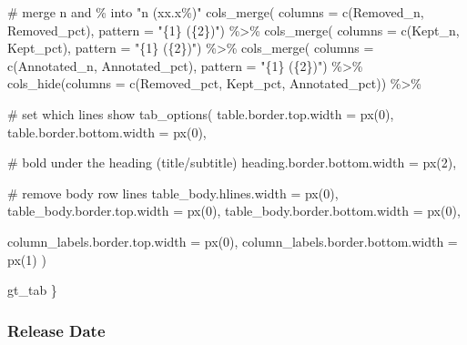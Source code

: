 \documentclass[
  man]{apa7}
\newenvironment{Shaded}{\begin{snugshade}}{\end{snugshade}}
\newcommand{\AttributeTok}[1]{\textcolor[rgb]{0.40,0.45,0.13}{#1}}
\newcommand{\CommentTok}[1]{\textcolor[rgb]{0.37,0.37,0.37}{#1}}
\newcommand{\DecValTok}[1]{\textcolor[rgb]{0.68,0.00,0.00}{#1}}
\newcommand{\FunctionTok}[1]{\textcolor[rgb]{0.28,0.35,0.67}{#1}}
\newcommand{\NormalTok}[1]{\textcolor[rgb]{0.00,0.23,0.31}{#1}}
\newcommand{\SpecialCharTok}[1]{\textcolor[rgb]{0.37,0.37,0.37}{#1}}
\newcommand{\StringTok}[1]{\textcolor[rgb]{0.13,0.47,0.30}{#1}}
\begin{document}
\begin{Shaded}
\begin{Highlighting}[]
    \CommentTok{\# merge n and \% into "n (xx.x\%)"}
    \FunctionTok{cols\_merge}\NormalTok{(}
      \AttributeTok{columns =} \FunctionTok{c}\NormalTok{(Removed\_n, Removed\_pct),}
      \AttributeTok{pattern =} \StringTok{"\{1\} (\{2\})"}\NormalTok{) }\SpecialCharTok{\%\textgreater{}\%}
    \FunctionTok{cols\_merge}\NormalTok{(}
      \AttributeTok{columns =} \FunctionTok{c}\NormalTok{(Kept\_n, Kept\_pct),}
      \AttributeTok{pattern =} \StringTok{"\{1\} (\{2\})"}\NormalTok{) }\SpecialCharTok{\%\textgreater{}\%}
    \FunctionTok{cols\_merge}\NormalTok{(}
      \AttributeTok{columns =} \FunctionTok{c}\NormalTok{(Annotated\_n, Annotated\_pct),}
      \AttributeTok{pattern =} \StringTok{"\{1\} (\{2\})"}\NormalTok{) }\SpecialCharTok{\%\textgreater{}\%}
    \FunctionTok{cols\_hide}\NormalTok{(}\AttributeTok{columns =} \FunctionTok{c}\NormalTok{(Removed\_pct, Kept\_pct, Annotated\_pct)) }\SpecialCharTok{\%\textgreater{}\%}
    
    \CommentTok{\# set which lines show}
    \FunctionTok{tab\_options}\NormalTok{(}
      \AttributeTok{table.border.top.width =} \FunctionTok{px}\NormalTok{(}\DecValTok{0}\NormalTok{),}
      \AttributeTok{table.border.bottom.width =} \FunctionTok{px}\NormalTok{(}\DecValTok{0}\NormalTok{),}
      
      \CommentTok{\# bold under the heading (title/subtitle)}
      \AttributeTok{heading.border.bottom.width =} \FunctionTok{px}\NormalTok{(}\DecValTok{2}\NormalTok{),}
      
      \CommentTok{\# remove body row lines}
      \AttributeTok{table\_body.hlines.width =} \FunctionTok{px}\NormalTok{(}\DecValTok{0}\NormalTok{),}
      \AttributeTok{table\_body.border.top.width =} \FunctionTok{px}\NormalTok{(}\DecValTok{0}\NormalTok{),}
      \AttributeTok{table\_body.border.bottom.width =} \FunctionTok{px}\NormalTok{(}\DecValTok{0}\NormalTok{),}
      
      \AttributeTok{column\_labels.border.top.width =} \FunctionTok{px}\NormalTok{(}\DecValTok{0}\NormalTok{),}
      \AttributeTok{column\_labels.border.bottom.width =} \FunctionTok{px}\NormalTok{(}\DecValTok{1}\NormalTok{)}
\NormalTok{    )}

\NormalTok{  gt\_tab}
\NormalTok{\}}
\end{Highlighting}
\end{Shaded}

\subsubsection{Release Date}\label{release-date}
\end{document}
